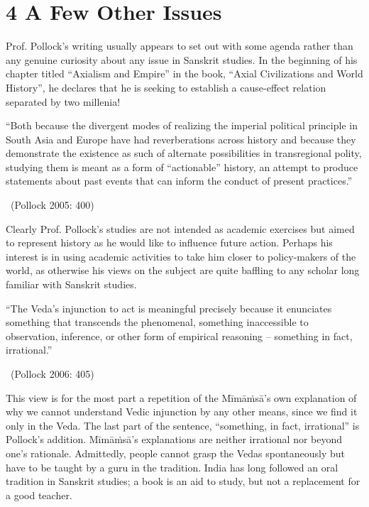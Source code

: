 \newpage

\section*{4 A Few Other Issues}

Prof. Pollock’s writing usually appears to set out with some agenda rather than any genuine curiosity about any issue in Sanskrit studies. In the beginning of his chapter titled “Axialism and Empire” in the book, “Axial Civilizations and World History”, he declares that he is seeking to establish a cause-effect relation separated by two millenia!

\begin{myquote}
“Both because the divergent modes of realizing the imperial political principle in South Asia and Europe have had reverberations across history and because they demonstrate the existence as such of alternate possibilities in transregional polity, studying them is meant as a form of “actionable” history, an attempt to produce statements about past events that can inform the conduct of present practices.” 

~\hfill (Pollock 2005: 400)
\end{myquote}

Clearly Prof. Pollock’s studies are not intended as academic exercises but aimed to represent history as he would like to influence future action. Perhaps his interest is in using academic activities to take him closer to policy-makers of the world, as otherwise his views on the subject are quite baffling to any scholar long familiar with Sanskrit studies.

\begin{myquote}
“The Veda’s injunction to act is meaningful precisely because it enunciates something that transcends the phenomenal, something inaccessible to observation, inference, or other form of empirical reasoning -- something in fact, irrational.” 

~\hfill (Pollock 2006: 405)
\end{myquote}

This view is for the most part a repetition of the Mīmāṁsā’s own explanation of why we cannot understand Vedic injunction by any other means, since we find it only in the Veda. The last part of the sentence, “something, in fact, irrational” is Pollock’s addition. Mīmāṁsā’s explanations are neither irrational nor beyond one’s rationale. Admittedly, people cannot grasp the Vedas spontaneously but have to be taught by a guru in the tradition. India has long followed an oral tradition in Sanskrit studies; a book is an aid to study, but not a replacement for a good teacher. 

